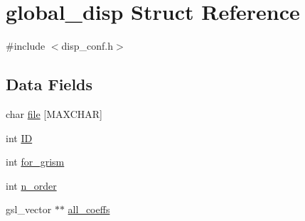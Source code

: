 \hypertarget{structglobal__disp}{
\section{global\_\-disp Struct Reference}
\label{structglobal__disp}
}


{\ttfamily \#include $<$disp\_\-conf.h$>$}\subsection*{Data Fields}
\begin{DoxyCompactItemize}
\item 
char \hyperlink{structglobal__disp_ae67de53cf4c491ab0347abffeaa18f8d}{file} \mbox{[}MAXCHAR\mbox{]}
\item 
int \hyperlink{structglobal__disp_a4606b56e1a2d862d42b339a184ca1f4b}{ID}
\item 
int \hyperlink{structglobal__disp_a44606b1a9c84c6c126b0cf4a35365246}{for\_\-grism}
\item 
int \hyperlink{structglobal__disp_a8a8e283bb77c336aa4cf6080c7582f38}{n\_\-order}
\item 
gsl\_\-vector $\ast$$\ast$ \hyperlink{structglobal__disp_a1af1bf0f9fbdc4a21997e3d0c5a64fd1}{all\_\-coeffs}
\end{DoxyCompactItemize}



